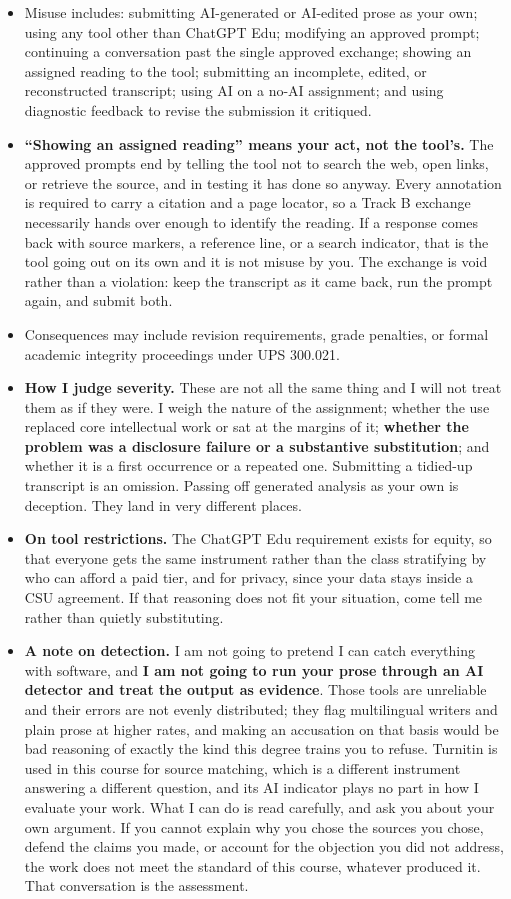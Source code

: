 \documentclass[11pt]{article}     %
\begin{document}
\begin{itemize}
    \item Misuse includes: submitting AI-generated or AI-edited prose as your own; using any tool other than ChatGPT Edu; modifying an approved prompt; continuing a conversation past the single approved exchange; showing an assigned reading to the tool; submitting an incomplete, edited, or reconstructed transcript; using AI on a no-AI assignment; and using diagnostic feedback to revise the submission it critiqued.
    \item \textbf{``Showing an assigned reading'' means your act, not the tool's.} The approved prompts end by telling the tool not to search the web, open links, or retrieve the source, and in testing it has done so anyway. Every annotation is required to carry a citation and a page locator, so a Track B exchange necessarily hands over enough to identify the reading. If a response comes back with source markers, a reference line, or a search indicator, that is the tool going out on its own and it is not misuse by you. The exchange is void rather than a violation: keep the transcript as it came back, run the prompt again, and submit both.
    \item Consequences may include revision requirements, grade penalties, or formal academic integrity proceedings under UPS 300.021.
    \item \textbf{How I judge severity.} These are not all the same thing and I will not treat them as if they were. I weigh the nature of the assignment; whether the use replaced core intellectual work or sat at the margins of it; \textbf{whether the problem was a disclosure failure or a substantive substitution}; and whether it is a first occurrence or a repeated one. Submitting a tidied-up transcript is an omission. Passing off generated analysis as your own is deception. They land in very different places.
    \item \textbf{On tool restrictions.} The ChatGPT Edu requirement exists for equity, so that everyone gets the same instrument rather than the class stratifying by who can afford a paid tier, and for privacy, since your data stays inside a CSU agreement. If that reasoning does not fit your situation, come tell me rather than quietly substituting.
    \item \textbf{A note on detection.} I am not going to pretend I can catch everything with software, and \textbf{I am not going to run your prose through an AI detector and treat the output as evidence}. Those tools are unreliable and their errors are not evenly distributed; they flag multilingual writers and plain prose at higher rates, and making an accusation on that basis would be bad reasoning of exactly the kind this degree trains you to refuse. Turnitin is used in this course for source matching, which is a different instrument answering a different question, and its AI indicator plays no part in how I evaluate your work. What I can do is read carefully, and ask you about your own argument. If you cannot explain why you chose the sources you chose, defend the claims you made, or account for the objection you did not address, the work does not meet the standard of this course, whatever produced it. That conversation is the assessment.

\end{itemize}
\end{document}

